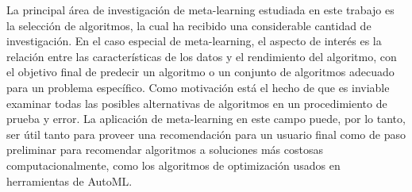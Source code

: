 \documentclass[a4paper,12pt]{article}
\begin{document}


La principal área de investigación de meta-learning estudiada en este trabajo es la selección de algoritmos, la cual ha recibido una considerable cantidad de investigación. En el caso especial de meta-learning, el aspecto de interés es la relación entre las características de los datos y el rendimiento del algoritmo, con el objetivo final de predecir un algoritmo o un conjunto de algoritmos adecuado para un problema específico. Como motivación está el hecho de que es inviable examinar todas las posibles alternativas de algoritmos en un procedimiento de prueba y error. La aplicación de meta-learning en este campo puede, por lo tanto, ser útil tanto para proveer una recomendación para un usuario final como de paso preliminar para recomendar algoritmos a soluciones más costosas computacionalmente, como los algoritmos de optimización usados en herramientas de AutoML. 
\end{document}
